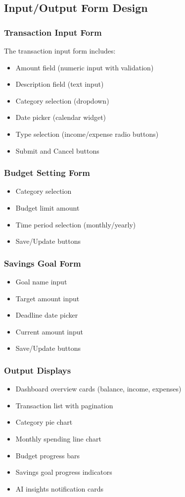 \documentclass[12pt,a4paper]{article}
\begin{document}
\subsection{Input/Output Form Design}

\subsubsection{Transaction Input Form}
The transaction input form includes:
\begin{itemize}
    \item Amount field (numeric input with validation)
    \item Description field (text input)
    \item Category selection (dropdown)
    \item Date picker (calendar widget)
    \item Type selection (income/expense radio buttons)
    \item Submit and Cancel buttons
\end{itemize}

\subsubsection{Budget Setting Form}
\begin{itemize}
    \item Category selection
    \item Budget limit amount
    \item Time period selection (monthly/yearly)
    \item Save/Update buttons
\end{itemize}

\subsubsection{Savings Goal Form}
\begin{itemize}
    \item Goal name input
    \item Target amount input
    \item Deadline date picker
    \item Current amount input
    \item Save/Update buttons
\end{itemize}

\subsubsection{Output Displays}
\begin{itemize}
    \item Dashboard overview cards (balance, income, expenses)
    \item Transaction list with pagination
    \item Category pie chart
    \item Monthly spending line chart
    \item Budget progress bars
    \item Savings goal progress indicators
    \item AI insights notification cards
\end{itemize}
\end{document}
